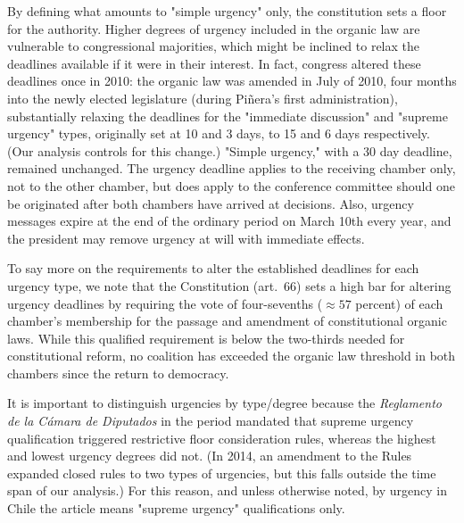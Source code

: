\documentclass[letter,12pt]{article}
\begin{document}
\noindent By defining what amounts to "simple urgency" only, the constitution sets a floor for the authority. Higher degrees of urgency included in the organic law are vulnerable to congressional majorities, which might be inclined to relax the deadlines available if it were in their interest. In fact, congress altered these deadlines once in 2010: the organic law was amended in July of 2010, four months into the newly elected legislature (during Piñera's first administration), substantially relaxing the deadlines for the "immediate discussion" and "supreme urgency" types, originally set at 10 and 3 days, to 15 and 6 days respectively. (Our analysis controls for this change.) "Simple urgency," with a 30 day deadline, remained unchanged. The urgency deadline applies to the receiving chamber only, not to the other chamber, but does apply to the conference committee should one be originated after both chambers have arrived at decisions. Also, urgency messages expire at the end of the ordinary period on March 10th every year, and the president may remove urgency at will with immediate effects. 

To say more on the requirements to alter the established deadlines for each urgency type, we note that the Constitution (art.~66) sets a high bar for altering urgency deadlines by requiring the vote of four-sevenths ($\approx 57$ percent) of each chamber's membership for the passage and amendment of constitutional organic laws. While this qualified requirement is below the two-thirds needed for constitutional reform, no coalition has exceeded the organic law threshold in both chambers since the return to democracy. 

It is important to distinguish urgencies by type/degree because the \emph{Reglamento de la Cámara de Diputados} in the period mandated that supreme urgency qualification triggered restrictive floor consideration rules, whereas the highest and lowest urgency degrees did not. (In 2014, an amendment to the Rules expanded closed rules to two types of urgencies, but this falls outside the time span of our analysis.) For this reason, and unless otherwise noted, by urgency in Chile the article means "supreme urgency" qualifications only. 
\end{document}
